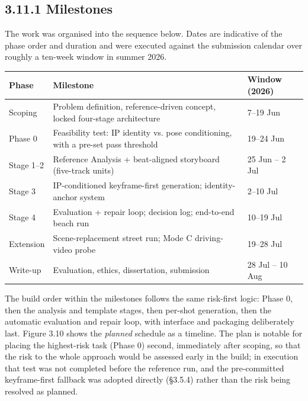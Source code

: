 \documentclass[10pt,twocolumn,letterpaper]{article}
\begin{document}

\subsection*{3.11.1 Milestones}

The work was organised into the sequence below. Dates are indicative of the phase order and duration and were executed against the submission calendar over roughly a ten-week window in summer 2026.

\begin{table}[t]
\centering
\footnotesize
\begin{tabularx}{\textwidth}{l>{\RaggedRight\arraybackslash}Xl}
\toprule
Phase & Milestone & Window (2026) \\
\midrule
Scoping & Problem definition, reference-driven concept, locked four-stage architecture & 7--19 Jun \\
Phase 0 & Feasibility test: IP identity vs. pose conditioning, with a pre-set pass threshold & 19--24 Jun \\
Stage 1--2 & Reference Analysis + beat-aligned storyboard (five-track units) & 25 Jun -- 2 Jul \\
Stage 3 & IP-conditioned keyframe-first generation; identity-anchor system & 2--10 Jul \\
Stage 4 & Evaluation + repair loop; decision log; end-to-end beach run & 10--19 Jul \\
Extension & Scene-replacement street run; Mode C driving-video probe & 19--28 Jul \\
Write-up & Evaluation, ethics, dissertation, submission & 28 Jul -- 10 Aug \\
\bottomrule
\end{tabularx}
\end{table}

The build order within the milestones follows the same risk-first logic: Phase 0, then the analysis and template stages, then per-shot generation, then the automatic evaluation and repair loop, with interface and packaging deliberately last. Figure 3.10 shows the \emph{planned} schedule as a timeline. The plan is notable for placing the highest-risk task (Phase 0) second, immediately after scoping, so that the risk to the whole approach would be assessed early in the build; in execution that test was not completed before the reference run, and the pre-committed keyframe-first fallback was adopted directly (\S{}3.5.4) rather than the risk being resolved as planned.
\end{document}
